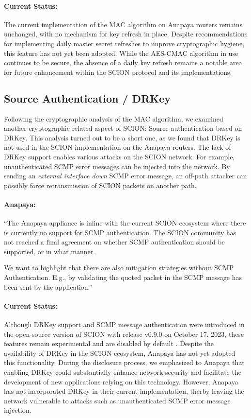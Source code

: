 \paragraph{Current Status:}
The current implementation of the MAC algorithm on Anapaya routers remains unchanged, with no mechanism for key refresh in place.
Despite recommendations for implementing daily master secret refreshes to improve cryptographic hygiene, this feature has not yet been adopted.
While the AES-CMAC algorithm in use continues to be secure, the absence of a daily key refresh remains a notable area for future enhancement within the SCION protocol and its implementations.

\subsection{Source Authentication / DRKey}
\label{sec:source-authentication}
Following the cryptographic analysis of the MAC algorithm, we examined another cryptographic related aspect of SCION: Source authentication based on DRKey.
This analysis turned out to be a short one, as we found that DRKey is not used in the SCION implementation on the Anapaya routers.
The lack of DRKey support enables various attacks on the SCION network.
For example, unauthenticated SCMP error messages can be injected into the network.
By sending an \textit{external interface down} SCMP error message, an off-path attacker can possibly force retransmission of SCION packets on another path.

\begin{boxH}
\paragraph{Anapaya:}
``The Anapaya appliance is inline with the current SCION ecosystem where there is currently no support for SCMP authentication. The SCION community has not reached a final agreement on whether SCMP authentication should be supported, or in what manner.

We want to highlight that there are also mitigation strategies without SCMP Authentication. E.g., by validating the quoted packet in the SCMP message has been sent by the application.''
\end{boxH}


\paragraph{Current Status:}
Although DRKey support and SCMP message authentication were introduced in the open-source version of SCION with release v0.9.0 on October 17, 2023, these features remain experimental and are disabled by default \cite{SCIONReleaseV090}.
Despite the availability of DRKey in the SCION ecosystem, Anapaya has not yet adopted this functionality.
During the disclosure process, we emphasized to Anapaya that enabling DRKey could substantially enhance network security and facilitate the development of new applications relying on this technology.
However, Anapaya has not incorporated DRKey in their current implementation, therby leaving the network vulnerable to attacks such as unauthenticated SCMP error message injection.


